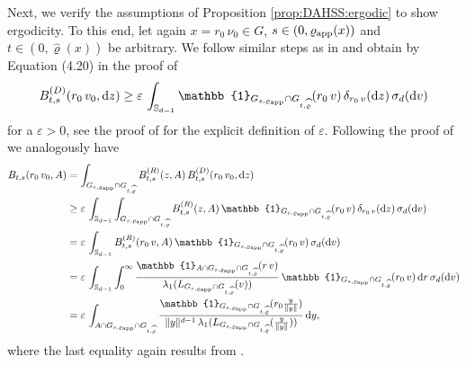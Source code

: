 \documentclass[sn-mathphys-num]{sn-jnl}%
\theoremstyle{thmstyleone}%
\theoremstyle{thmstyletwo}%
\theoremstyle{thmstylethree}%
\newcommand{\rhoapp}{\varrho_{{\rm app}}}
\newcommand{\change}[1]{\bgroup\color{black}#1\egroup}    %
\begin{document}
\begin{appendices}
\change{Next, we verify the assumptions of Proposition \ref{prop:DAHSS:ergodic} to show ergodicity. To this end, let again $x= r_0 \, \nu_0\in G$, $s \in (0, \rhoapp(x))$ and $t \in (0, \widehat{\varrho}(x))$ be arbitrary. 
We follow similar steps as in \cite{SchaerEtAl2023} and obtain by Equation (4.20) in the proof of \cite[Theorem~4.14]{Schaer2025}}  
    \[
       B^{(D)}_{t,s}(r_0\, v_0, \mathrm{d}z) \geq \varepsilon \, \int_{\mathbb{S}_{d-1}} \mathbb{1}_{G_{s,\varrho_{\textmd{app}}}\cap G_{t,\widehat{\varrho}}}(r_0\, v) \, \delta_{r_0 \, v}(\mathrm{d}z) \, \sigma_d(\mathrm{d}v)
    \]
    for a $\varepsilon>0$, see the proof of \cite[Theorem~4.14]{Schaer2025} for the explicit definition of $\varepsilon$. Following the proof of \cite[Theorem~3.2]{SchaerEtAl2023} we analogously have
    \begin{align*}
        B_{t,s}(r_0\, v_0, A)&= \int_{ G_{s, \varrho_{\textmd{app}}}\cap G_{t, \widehat{\varrho}}} B^{(R)}_{t,s}(z, A) \, B^{(D)}_\change{{t,s}}(r_0\, v_0, \mathrm{d}z) \\
                           &\geq \varepsilon \, \int_{\mathbb{S}_{d-1}} \int_{ G_{s, \varrho_{\textmd{app}}}\cap G_{t, \widehat{\varrho}}}  B^{(R)}_{t,s}(z, A) \, \mathbb{1}_{G_{s,\varrho_{\textmd{app}}}\cap G_{t,\widehat{\varrho}}}(r_0\, v) \, \delta_{r_0 \, v}(\mathrm{d}z) \, \sigma_d(\mathrm{d}v) \\
                           &= \varepsilon \, \int_{\mathbb{S}_{d-1}} B^{(R)}_{t,s}(r_0 \, v, A) \, \mathbb{1}_{G_{s,\varrho_{\textmd{app}}}\cap G_{t,\widehat{\varrho}}}(r_0\, v) \, \sigma_d(\mathrm{d}v) \\ 
                           &= \varepsilon \, \int_{\mathbb{S}_{d-1}} \int_{0}^\infty  \frac{\mathbb{1}_{A \cap G_{s,\varrho_{\textmd{app}}}\cap G_{t,\widehat{\varrho}}}(r\,v)}{\lambda_1(L_{G_{s,\varrho_{\textmd{app}}}\cap G_{t,\widehat{\varrho}}}(v))} \, \mathbb{1}_{G_{s,\varrho_{\textmd{app}}}\cap G_{t,\widehat{\varrho}}}(r_0\,v) \, \mathrm{d}r \, \sigma_d(\mathrm{d}v) \\
                           &= \varepsilon \, \int_{A \cap G_{s,\varrho_{\textmd{app}}}\cap G_{t,\widehat{\varrho}}} \frac{\mathbb{1}_{G_{s,\varrho_{\textmd{app}}}\cap G_{t,\widehat{\varrho}}}(r_0\frac{y}{\|y\|})}{\|y\|^{d-1} \, \lambda_1(L_{G_{s,\varrho_{\textmd{app}}}\cap G_{t,\widehat{\varrho}}}(\frac{y}{\|y\|}))} \, \mathrm{d}y,  
    \end{align*}
    where the last equality again results from \cite[Theorem~15.13]{Schilling2005}. 
    

\end{appendices}
\end{document}
